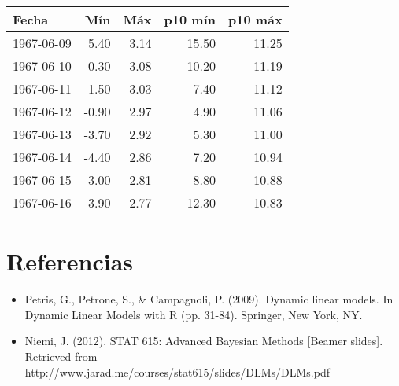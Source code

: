 \documentclass{article}
\begin{document}
\begin{scriptsize}
\begin{center}
\begin{tabular}{lrrrr}
  \hline
Fecha & Mín & Máx & p10 mín & p10 máx \\ 
  \hline
1967-06-09 & 5.40 & 3.14 & 15.50 & 11.25 \\ 
  1967-06-10 & -0.30 & 3.08 & 10.20 & 11.19 \\ 
  1967-06-11 & 1.50 & 3.03 & 7.40 & 11.12 \\ 
  1967-06-12 & -0.90 & 2.97 & 4.90 & 11.06 \\ 
  1967-06-13 & -3.70 & 2.92 & 5.30 & 11.00 \\ 
  1967-06-14 & -4.40 & 2.86 & 7.20 & 10.94 \\ 
  1967-06-15 & -3.00 & 2.81 & 8.80 & 10.88 \\ 
  1967-06-16 & 3.90 & 2.77 & 12.30 & 10.83 \\ 
   \hline
\end{tabular}
\end{center}
\end{scriptsize}

\section{Referencias}

\begin{itemize}
\item Petris, G., Petrone, S., \& Campagnoli, P. (2009). Dynamic linear models. In Dynamic Linear Models with R (pp. 31-84). Springer, New York, NY.

\item Niemi, J. (2012). STAT 615: Advanced Bayesian Methods [Beamer slides]. Retrieved from http://www.jarad.me/courses/stat615/slides/DLMs/DLMs.pdf

\end{itemize}
\end{document}
